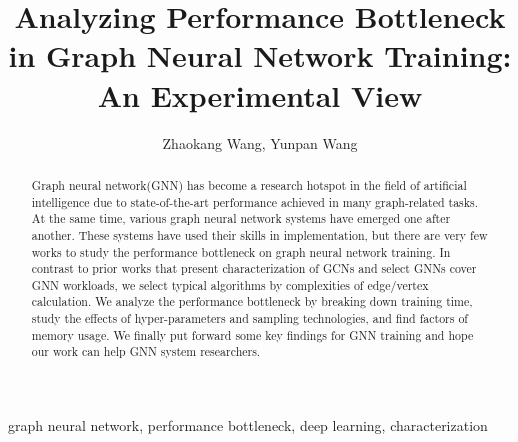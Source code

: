 \documentclass{elsarticle}
\begin{document}
\begin{frontmatter}

	\title{Analyzing Performance Bottleneck in Graph Neural Network Training: An Experimental View}
	\author{Zhaokang Wang, Yunpan Wang}%
	\address{State Key Laboratory for Novel Software Technology, \\Department of Computer Science and Technology, Nanjing University, \\Nanjing 210023, China}

	\begin{abstract}
        Graph neural network(GNN) has become a research hotspot in the field of artificial intelligence due to state-of-the-art performance achieved in many graph-related tasks. At the same time, various graph neural network systems have emerged one after another.
        These systems have used their skills in implementation, but there are very few works to study the performance bottleneck on graph neural network training. In contrast to prior works that present characterization of GCNs and select GNNs cover GNN workloads,
		we select typical algorithms by complexities of edge/vertex calculation. We analyze the performance bottleneck by breaking down training time, study the effects of hyper-parameters and sampling technologies, and find factors of memory usage. 
		We finally put forward some key findings for GNN training and hope our work can help GNN system researchers.
	\end{abstract}

	\begin{keyword}
		graph neural network, performance bottleneck, deep learning, characterization
	\end{keyword}

\end{frontmatter}

\linenumbers











\end{document}
